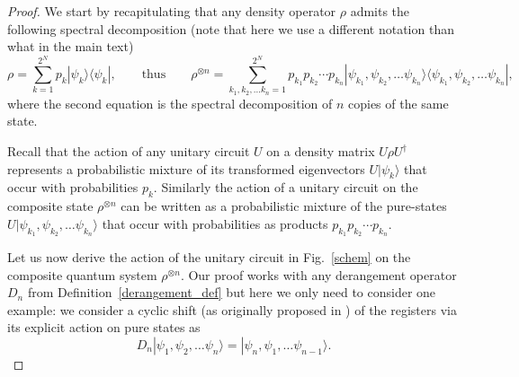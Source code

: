 \documentclass[aps,prx,showpacs,twocolumn,reprint]{revtex4-2}
\newcommand{\perm}{D_n}
\begin{document}
{\begin{proof}
	We start by recapitulating that any density operator $\rho$ admits the following spectral decomposition 
	(note that here we use a different notation than what in the main text)
	\begin{equation}
	\rho = \sum_{k=1}^{2^N} p_k |\psi_k \rangle \langle \psi_k |,
	\quad \quad \text{thus} \quad \quad
	\rho^{\otimes n} = \sum_{k_1,k_2,\dots k_n=1}^{2^N} p_{k_1}p_{k_2}\cdots p_{k_n}  
	|\psi_{k_1}, \psi_{k_2},  \dots \psi_{k_n} \rangle \langle \psi_{k_1}, \psi_{k_2},  \dots \psi_{k_n} |,
	\end{equation}
	where the second equation is the spectral decomposition of $n$ copies of the same state.

	Recall that the action of any unitary circuit $U$ on a density matrix
	$U \rho U^\dagger$ represents a probabilistic mixture
	of its transformed eigenvectors $U |\psi_k \rangle$ that occur with probabilities $p_k$.
	Similarly the action of a unitary circuit on the composite state $\rho^{\otimes n}$ can
	be written as a probabilistic mixture of the pure-states $U |\psi_{k_1}, \psi_{k_2},  \dots \psi_{k_n} \rangle$
	that occur with probabilities as products $p_{k_1}p_{k_2}\cdots p_{k_n}$.
	
	Let us now derive the action of the unitary circuit in Fig.~\ref{schem} on the composite quantum system
	$\rho^{\otimes n}$.
	Our proof works with any derangement operator $\perm$ from Definition~\ref{derangement_def}
	but here we only need to consider one example: we consider a cyclic shift
	(as originally proposed in \cite{ekert2002direct}) of the registers 
	via its explicit action on pure states as
	$$  \perm | \psi_1 , \psi_2 , \dots \psi_n \rangle = |\psi_n , \psi_1  , \dots \psi_{n-1}\rangle. $$


\end{proof}}
\end{document}
